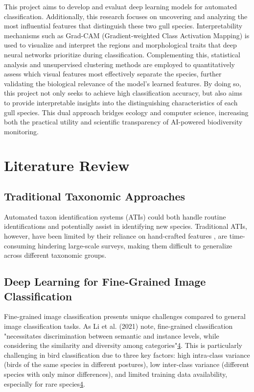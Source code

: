 \documentclass[a4paper,12pt]{report}
\begin{document}
This project aims to develop and evaluat deep learning models for automated classification. Additionally, this research focuses on uncovering and analyzing the most influential features that distinguish these two gull species. Interpretability mechanisms such as Grad-CAM (Gradient-weighted Class Activation Mapping) is used to visualize and interpret the regions and morphological traits that deep neural networks prioritize during classification. Complementing this, statistical analysis and unsupervised clustering methods are employed to quantitatively assess which visual features most effectively separate the species, further validating the biological relevance of the model’s learned features. By doing so, this project not only seeks to achieve high classification accuracy, but also aims to provide interpretable insights into the distinguishing characteristics of each gull species. This dual approach bridges ecology and computer science, increasing both the practical utility and scientific transparency of AI-powered biodiversity monitoring.

\newpage
\chapter{Literature Review}
\section*{Traditional Taxonomic Approaches}
Automated taxon identification systems (ATIs) could both handle routine identifications and potentially assist in identifying new species. Traditional ATIs, however, have been limited by their reliance on hand-crafted features \citep{valan}, are time-consuming hindering large-scale surveys, making them difficult to generalize across different taxonomic groups.

\section*{Deep Learning for Fine-Grained Image Classification}
Fine-grained image classification presents unique challenges compared to general image classification tasks. As Li et al. (2021) note, fine-grained classification "necessitates discrimination between semantic and instance levels, while considering the similarity and diversity among categories"\href{https://www.frontiersin.org/journals/neurorobotics/articles/10.3389/fnbot.2024.1391791/full}{4}. This is particularly challenging in bird classification due to three key factors: high intra-class variance (birds of the same species in different postures), low inter-class variance (different species with only minor differences), and limited training data availability, especially for rare species\href{https://www.frontiersin.org/journals/neurorobotics/articles/10.3389/fnbot.2024.1391791/full}{4}.
\end{document}
